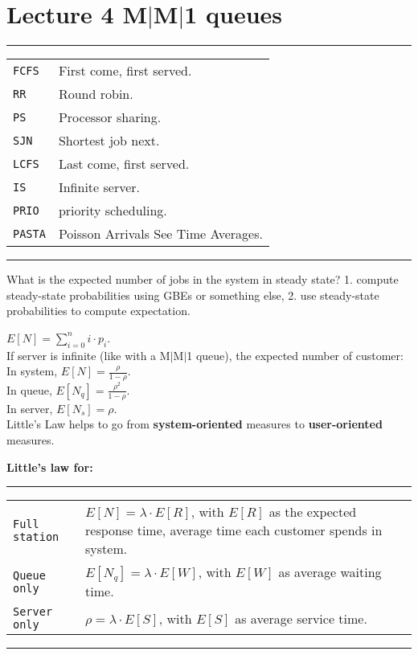 \section{Lecture 4 M$|$M$|$1 queues}
\hrule
{}
\begin{tabular}{@{}p{\the\MyLen}@{}p{\linewidth-\the\MyLen}@{}}
\verb!FCFS!				&	First come, first served.\\
\verb!RR!				&	Round robin.\\
\verb!PS!				&	Processor sharing.\\
\verb!SJN!				&	Shortest job next.\\
\verb!LCFS!				&	Last come, first served.\\
\verb!IS!				&	Infinite server.\\
\verb!PRIO!				&	priority scheduling.\\
\verb!PASTA!			&	Poisson Arrivals See Time Averages.\\
\end{tabular}
\hrule

What is the expected number of jobs in the system in steady
state? 1. compute steady-state probabilities using GBEs or something else, 2. use steady-state probabilities to compute expectation. 

$E[N] = \sum^{n}_{i=0} i \cdot p_{i}$.\\
If server is infinite (like with a M$|$M$|$1 queue), the expected number of customer:\\
In system, $E[N] = \frac{\rho}{1-\rho}$.\\
In queue, $E[N_{q}] = \frac{\rho^2}{1-\rho}$.\\
In server, $E[N_{s}] = \rho$.\\

Little's Law helps to go from \textbf{system-oriented} measures to \textbf{user-oriented} measures. 

\textbf{Little's law for:}
\hrule
{}
\begin{tabular}{@{}p{\the\MyLen}@{}p{\linewidth-\the\MyLen}@{}}
\verb!Full station!				&	$E[N] = \lambda \cdot E[R]$, with $E[R]$ as the expected response time, average time each customer spends in system.\\
\verb!Queue only!				&	$E[N_{q}] = \lambda \cdot E[W]$, with $E[W]$ as average waiting time.\\
\verb!Server only!				&	$\rho = \lambda \cdot E[S]$, with $E[S]$ as  average service time.\\
\end{tabular}
\hrule

